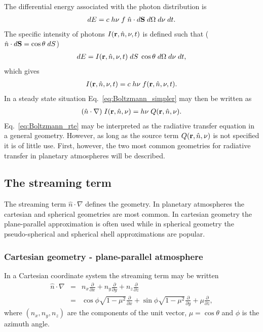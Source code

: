 The differential energy associated with the photon distribution is
\begin{eqnarray}
dE = c\; h\nu\; f\; \hat{n}\cdot d{\bf S} \;d\Omega\; d\nu \; dt.
  \label{eq:diff_energy}
\end{eqnarray}
The specific intensity of photons
$I({\bf r},\hat{n}, \nu, t)$ is defined such that
($\hat{n}\cdot d{\bf S} = \cos \theta \;dS$)
\begin{eqnarray}
dE = I({\bf r},\hat{n}, \nu, t)\; dS \;\cos\theta\; d\Omega\; d\nu \; dt,
  \label{eq2.5}
\end{eqnarray}
which  gives
\begin{eqnarray}
I({\bf r},\hat{n}, \nu, t) = c\; h\nu \;f({\bf r},\hat{n}, \nu, t).
  \label{eq2.6}
\end{eqnarray}
In a steady state situation Eq.~\ref{eq:Boltzmann_simpler} may then be
written as
\begin{eqnarray}
  ( \hat{n}\cdot \nabla)\;I({\bf r},\hat{n}, \nu)  
     = h\nu \;Q({\bf r},\hat{n}, \nu). 
  \label{eq:Boltzmann_rte}
\end{eqnarray}
Eq.~\ref{eq:Boltzmann_rte} may be interpreted as the radiative
transfer equation in a general geometry. However, as long as the
source term $Q({\bf r},\hat{n}, \nu)$ is not specified it is of little
use. First, however, the two most common geometries for radiative
transfer in planetary atmospheres will be described.

\subsection{The streaming term}
The streaming term $\hat{n}\cdot \nabla$ defines the geometry. In
planetary atmospheres the cartesian and spherical geometries are
most common. In cartesian geometry the plane-parallel approximation is
often used while in spherical geometry the pseudo-spherical and
spherical shell approximations are popular.
\subsubsection{Cartesian geometry - plane-parallel atmosphere}
In a Cartesian coordinate system the streaming term may be written
\citep{Rottmann1991,Kuo1996}
\begin{eqnarray}
   \hat{n}\cdot \nabla &=& n_x \frac{\partial}{\partial x} + n_y
   \frac{\partial}{\partial y} + n_z \frac{\partial}{\partial
     z}\nonumber \\ &=&
   \cos\phi\sqrt{1-\mu^2}\frac{\partial}{\partial x} +
   \sin\phi\sqrt{1-\mu^2}\frac{\partial}{\partial y} +
   \mu \frac{\partial}{\partial z},
  \label{eq:CartesianStreamingTerm}
\end{eqnarray}
where $(n_x, n_y, n_z)$ are the components of the unit vector,
$\mu=\cos\theta$ and $\phi$ is the azimuth angle.

